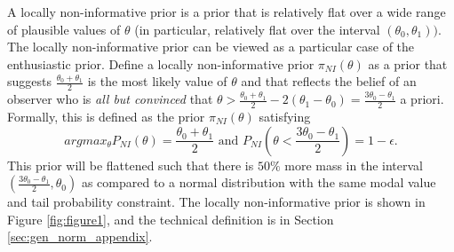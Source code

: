 \documentclass[useAMS,usenatbib,referee]{biom}
\begin{document}
A locally non-informative prior is a prior that is relatively flat over a wide range of plausible values of $\theta$ (in particular, relatively flat over the interval $(\theta_0,\theta_1))$. The locally non-informative prior can be viewed as a particular case of the enthusiastic prior. Define a locally non-informative prior $\pi_{NI}(\theta)$ as a prior that suggests $\frac{\theta_0+\theta_1}{2}$ is the most likely value of $\theta$ and that reflects the belief of an observer who is \textit{all but convinced} that $\theta>\frac{\theta_0+\theta_1}{2}-2(\theta_1-\theta_0)=\frac{3\theta_0-\theta_1}{2}$ a priori. Formally, this is defined as the prior $\pi_{NI}(\theta)$ satisfying
\begin{equation}\label{eq:niprior}
argmax_\theta P_{NI}(\theta)=\frac{\theta_0+\theta_1}{2}\text{ and } P_{NI}(\theta<\frac{3\theta_0-\theta_1}{2})=1-\epsilon.
\end{equation}
This prior will be flattened such that there is $50\%$ more mass in the interval $(\frac{3\theta_0-\theta_1}{2},\theta_0)$ as compared to a normal distribution with the same modal value and tail probability constraint. The locally non-informative prior is shown in Figure \ref{fig:figure1}, and the technical definition is in Section \ref{sec:gen_norm_appendix}.
\end{document}
